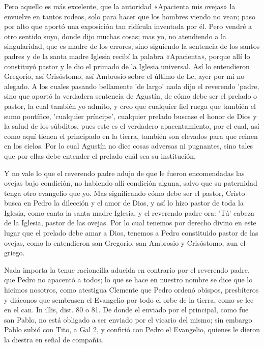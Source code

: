 Pero aquello es más excelente, que la autoridad «Apacienta mis ovejas» la envuelve en tantos rodeos, solo para hacer que los hombres viendo no vean; paso por alto que aportó una exposición tan ridícula inventada por él. Pero vendré a otro sentido suyo, donde dijo muchas cosas; mas yo, no atendiendo a la singularidad, que es madre de los errores, sino siguiendo la sentencia de los santos padres y de la santa madre Iglesia recibí la palabra «Apacienta», porque allí lo constituyó pastor y le dio el primado de la Iglesia universal. Así lo entendieron Gregorio, así Crisóstomo, así Ambrosio sobre el último de Lc, ayer por mí no alegado. A los cuales pasando bellamente 'de largo' nada dijo el reverendo 'padre, sino que aportó la verdadera sentencia de Agustín, de cómo debe ser el prelado o pastor, la cual también yo admito, y creo que cualquier fiel ruega que también el sumo pontífice, 'cualquier príncipe', cualquier prelado buscase el honor de Dios y la salud de los súbditos, pues este es el verdadero apacentamiento, por el cual, así como aquí tienen el principado en la tierra, también son elevados para que reinen en los cielos. Por lo cual Agustín no dice cosas adversas ni pugnan­tes, sino tales que por ellas debe entender el prelado cuál sea su institución.

Y no vale lo que el reverendo padre adujo de que le fueron encomendadas las ovejas bajo condición, no habiendo allí condición alguna, salvo que su paternidad tenga otro evangelio que yo. Mas significando cómo debe ser el pastor, Cristo busca en Pedro la dilección y el amor de Dios, y así lo hizo pastor de toda la Iglesia, como canta la santa madre Iglesia, y el reverendo \marginpar{\small[308]} padre ora: 'Tú' cabeza de la Iglesia, pastor de las ovejas. Por lo cual tenemos por derecho divino en este lugar que el prelado debe amar a Dios, tenemos a Pedro constituido pastor de las ovejas, como lo entendieron san Gregorio, san Ambrosio y Crisóstomo, aun el griego.

Nada importa la tenue racioncilla aducida en contrario por el reverendo padre, que Pedro no apacentó a todos; lo que se hace en nuestro nombre se dice que lo hicimos nosotros, como atestigua Clemente que Pedro ordenó obispos, presbíteros y diáconos que sembrasen el Evangelio por todo el orbe de la tierra, como se lee en el can. In illis, dist. 80 o 81. De donde el enviado por el principal, como fue san Pablo, no está obligado a ser enviado por el vicario del mismo; sin embargo Pablo subió con Tito, a Gal 2, y confirió con Pedro el Evangelio, quienes le dieron la diestra en señal de compañía.


